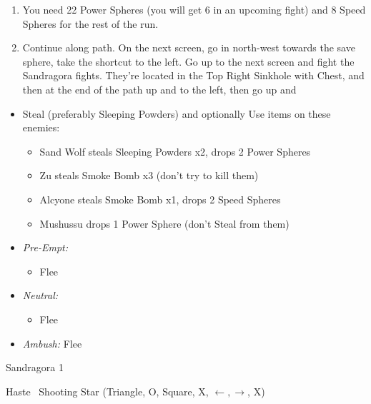 \begin{enumerate}[resume]
	\item You need 22 Power Spheres (you will get 6 in an upcoming fight) and 8 Speed Spheres for the rest of the run.
	\item Continue along path. On the next screen, go in north-west towards the save sphere, take the shortcut to the left. Go up to the next screen and fight the Sandragora fights. They're located in the Top Right Sinkhole with Chest, and then at the end of the path up and to the left, then go up and \sd
\end{enumerate}
\winvfill
\begin{encounters}
	\begin{itemize}
		\item Steal (preferably Sleeping Powders) and optionally Use items on these enemies:
		\begin{itemize}
			\item Sand Wolf steals Sleeping Powders x2, drops 2 Power Spheres
			\item Zu steals Smoke Bomb x3 (don't try to kill them)
			\item Alcyone steals Smoke Bomb x1, drops 2 Speed Spheres
			\item Mushussu drops 1 Power Sphere (don't Steal from them)
		\end{itemize}
		\item \textit{Pre-Empt:}
		      \begin{itemize}
			      \tidusf Defend
			      \rikkuf Steal or Use a Smoke Bomb/Silence Grenade/Sleeping Powder
			      \auronf Defend
			      \item Flee
		      \end{itemize}
		\item \textit{Neutral:}
		      \begin{itemize}
			      \switch{\tidus}{\kimahri}
			      \kimahrif Steal
				  \rikkuf Switch for \tidus\ or Use a Smoke Bomb/Silence Grenade/Sleeping Powder
			      \item Flee
		      \end{itemize}
		\item \textit{Ambush:} Flee
	\end{itemize}
\end{encounters}
\begin{battle}{Sandragora 1}
	\begin{itemize}
		\tidusf Haste \auron
		\auronf \od\ Shooting Star (Triangle, O, Square, X, $\leftarrow, \rightarrow$, X)
	\end{itemize}
\end{battle}
